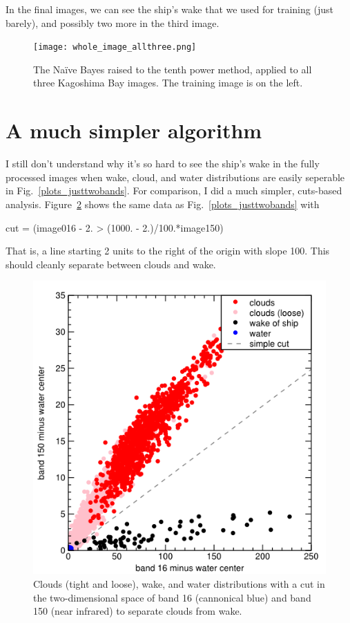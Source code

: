 \documentclass[12pt]{article}
\begin{document}
In the final images, we can see the ship's wake that we used for training
(just barely), and possibly two more in the third image.

\begin{figure}[!b]
\begin{center}
\texttt{[image: whole\_image\_allthree.png]}
\end{center}
\caption{The Na\"ive Bayes raised to the tenth power method, applied to all three Kagoshima Bay images.  The training image is on the left. \label{whole_image_allthree}}
\end{figure}

\section{A much simpler algorithm}

I still don't understand why it's so hard to see the ship's wake in
the fully processed images when wake, cloud, and water distributions
are easily seperable in Fig.~\ref{plots_justtwobands}.  For
comparison, I did a much simpler, cuts-based analysis.
Figure~\ref{plots_simplecut} shows the same data as
Fig.~\ref{plots_justtwobands} with
\begin{python}
cut = (image016 - 2. > (1000. - 2.)/100.*image150)
\end{python}
That is, a line starting 2 units to the right of the origin with slope
100.  This should cleanly separate between clouds and wake.

\begin{figure}
\begin{center}
\includegraphics[width=0.75\linewidth]{plots_simplecut.png}
\end{center}
\caption{Clouds (tight and loose), wake, and water distributions with
  a cut in the two-dimensional space of band 16 (cannonical blue) and
  band 150 (near infrared) to separate clouds from wake. \label{plots_simplecut}}
\end{figure}
\end{document}
